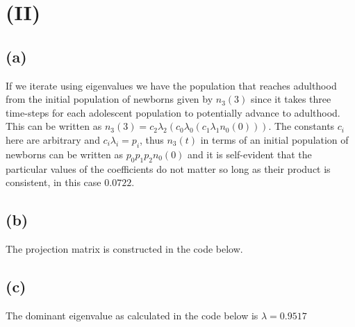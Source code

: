 \documentclass{article}
\begin{document}
\section*{\textbf{(II)}}
\subsection*{\textbf{(a)}}
If we iterate using eigenvalues we have the population that reaches adulthood from the initial population of newborns given by $n_3(3)$ since it takes three time-steps for each adolescent population to potentially advance to adulthood. This can be written as $n_3(3) = c_2\lambda_2(c_0\lambda_0(c_1\lambda_1n_0(0)))$. The constants $c_i$ here are arbitrary and $c_i\lambda_i = p_i$, thus $n_3(t)$ in terms of an initial population of newborns can be written as $p_0p_1p_2n_0(0)$ and it is self-evident that the particular values of the coefficients do not matter so long as their product is consistent, in this case $0.0722$.
\subsection*{\textbf{(b)}}
The projection matrix is constructed in the code below.
\subsection*{\textbf{(c)}}
The dominant eigenvalue as calculated in the code below is $\lambda = 0.9517$
\end{document}
